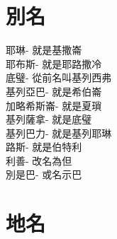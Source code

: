 
\section{別名}
       耶琳- 就是基撒崙\\
       耶布斯- 就是耶路撒冷\\
       底璧- 從前名叫基列西弗\\
       基列亞巴-  就是希伯崙\\
       加略希斯崙- 就是夏瑣\\
       基列薩拿- 就是底璧\\
       基列巴力- 就是基列耶琳\\
       路斯- 就是伯特利\\
       利善- 改名為但\\
       別是巴- 或名示巴\\


\section{地名}
